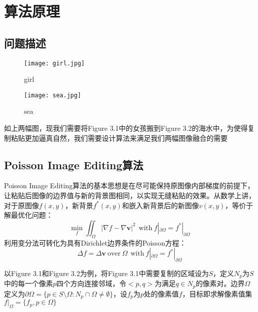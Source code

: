 \documentclass[14pt]{scrartcl} %
\begin{document}
\section{算法原理}

\subsection{问题描述}
\begin{figure}[h] %
	\begin{minipage}[t]{0.5\linewidth}
		\centering
		\texttt{[image: girl.jpg]}
		\caption{girl}
	\end{minipage}%
	\begin{minipage}[t]{0.5\linewidth}
		\centering
		\texttt{[image: sea.jpg]}
		\caption{sea}
	\end{minipage}
\end{figure}
如上两幅图，现我们需要将Figure 3.1中的女孩搬到Figure 3.2的海水中，为使得复制粘贴更加逼真自然，我们需要设计算法来满足我们两幅图像融合的需要

\subsection{Poisson Image Editing算法\cite{perez2003poisson}}

Poisson Image Editing算法的基本思想是在尽可能保持原图像内部梯度的前提下，让粘贴后图像的边界值与新的背景图相同，以实现无缝粘贴的效果。从数学上讲，对于原图像$f(x,y)$，新背景$f^*(x,y)$和嵌入新背景后的新图像$v(x,y)$，等价于解最优化问题：
\begin{equation}
\min\limits_f \iint _\Omega |\nabla f-\nabla \boldsymbol v |^2 \ \ \mathrm{with}\ f|_{\partial \Omega}=f^*|_{\partial \Omega}
\end{equation}
利用变分法可转化为具有Dirichlet边界条件的Poisson方程：
\begin{equation}
\Delta f= \Delta \boldsymbol v\ \mathrm{over}\ \Omega \ \ \mathrm{with}\ f|_{\partial \Omega}=f^*|_{\partial \Omega}
\end{equation}


以Figure 3.1和Figure 3.2为例，将Figure 3.1中需要复制的区域设为$S$，定义$N_p$为$S$中的每一个像素$p$四个方向连接邻域，令$<p,q>$为满足$q\in N_p$的像素对。边界$\Omega$定义为$\partial \Omega =\{p\in S\setminus \Omega: N_p \cap \Omega \neq \emptyset \}$，设$f_p$为$p$处的像素值$f$，目标即求解像素值集$f|_\Omega =\{f_p,p\in \Omega\}$
\end{document}
